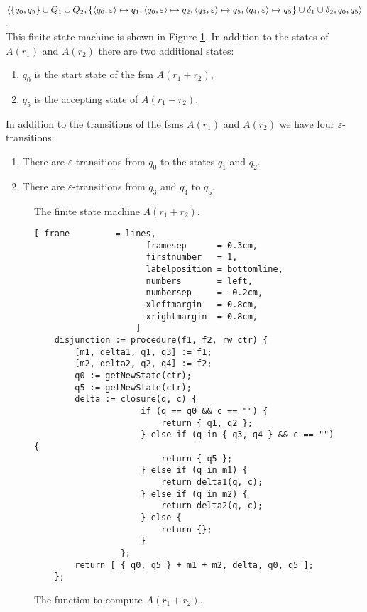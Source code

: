 \begin{enumerate}
      \hspace*{0.0cm}
       $\langle \{ q_0, q_5 \} \cup Q_1 \cup Q_2, 
                \{ \pair(q_0,\varepsilon) \mapsto q_1, \pair(q_0,\varepsilon) \mapsto q_2,
                   \pair(q_3,\varepsilon) \mapsto q_5, \pair(q_4,\varepsilon) \mapsto q_5 \} 
                   \cup \delta_1 \cup \delta_2, q_0, q_5 \rangle$.
      \\[0.2cm]
      This finite state machine is shown in Figure \ref{fig:aPlus.eps}.
      In addition to the states of $A(r_1)$ and $A(r_2)$ there are two additional 
      states:
      \begin{enumerate}
      \item $q_0$ is the start state of the fsm $A(r_1 + r_2)$,
      \item $q_5$ is the accepting state of $A(r_1 + r_2)$.
      \end{enumerate}
      In addition to the transitions of the fsms  $A(r_1)$ and $A(r_2)$ we have four $\varepsilon$-transitions.
      \begin{enumerate}
      \item There are $\varepsilon$-transitions from $q_0$ to the states $q_1$ and $q_2$.
      \item There are $\varepsilon$-transitions from  $q_3$ and $q_4$ to $q_5$.
      \end{enumerate}
                   
      \begin{figure}[!ht]
        \centering
      \caption{The finite state machine $A(r_1 + r_2)$.}
      \label{fig:aPlus.eps}
      \end{figure}

    \begin{figure}[!ht]
    \centering
    \begin{Verbatim}[ frame         = lines, 
                      framesep      = 0.3cm, 
                      firstnumber   = 1,
                      labelposition = bottomline,
                      numbers       = left,
                      numbersep     = -0.2cm,
                      xleftmargin   = 0.8cm,
                      xrightmargin  = 0.8cm,
                    ]
    disjunction := procedure(f1, f2, rw ctr) {
        [m1, delta1, q1, q3] := f1;
        [m2, delta2, q2, q4] := f2;
        q0 := getNewState(ctr); 
        q5 := getNewState(ctr); 
        delta := closure(q, c) {
                     if (q == q0 && c == "") {
                         return { q1, q2 };
                     } else if (q in { q3, q4 } && c == "") {
                         return { q5 };
                     } else if (q in m1) {
                         return delta1(q, c);
                     } else if (q in m2) {
                         return delta2(q, c);
                     } else {
                         return {};
                     } 
                 };
        return [ { q0, q5 } + m1 + m2, delta, q0, q5 ];
    };
    \end{Verbatim}
    \vspace*{-0.3cm}
    \caption{The function to compute $A(r_1 + r_2)$.}
    \label{fig:disjunction.stlx}
    \end{figure}
      

\end{enumerate}
